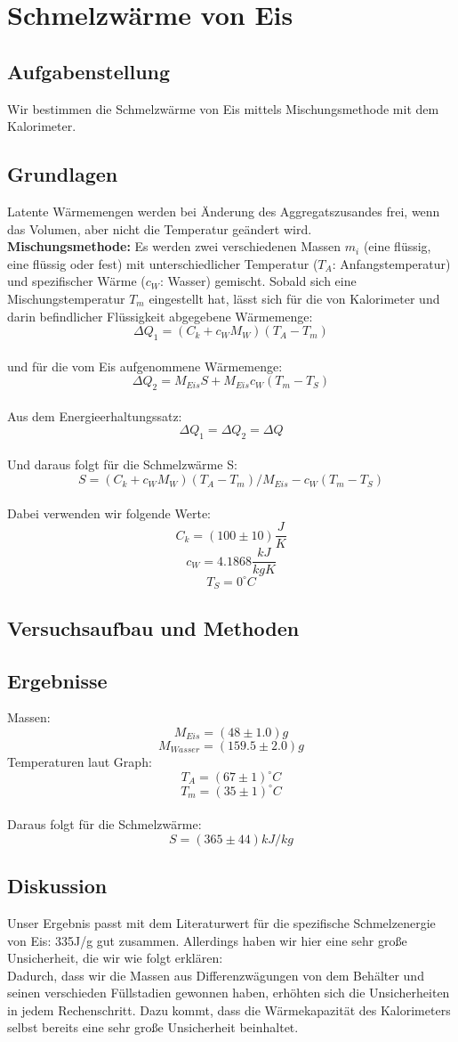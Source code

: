 \documentclass{article}
\begin{document}
\section{Schmelzwärme von Eis}
\subsection{Aufgabenstellung}
Wir bestimmen die Schmelzwärme von Eis mittels Mischungsmethode mit dem Kalorimeter.
\subsection{Grundlagen}
Latente Wärmemengen werden bei Änderung des Aggregatszusandes frei, wenn das Volumen, aber nicht die Temperatur geändert wird. \\
\textbf{Mischungsmethode:}
Es werden zwei verschiedenen Massen $m_i$ (eine flüssig, eine flüssig oder fest) mit unterschiedlicher Temperatur ($T_A$: Anfangstemperatur) und spezifischer Wärme ($c_W$: Wasser) gemischt. Sobald sich eine Mischungstemperatur $T_m$ eingestellt hat, lässt sich für die von Kalorimeter und darin befindlicher Flüssigkeit abgegebene Wärmemenge:
$$\Delta Q_1=(C_k + c_W M_W)(T_A - T_m)$$
\\
und für die vom Eis aufgenommene Wärmemenge:
$$\Delta Q_2=M_{Eis} S + M_{Eis} c_W (T_m - T_S)$$
\\
Aus dem Energieerhaltungssatz:
$$\Delta Q_1=\Delta Q_2=\Delta Q$$
\\
Und daraus folgt für die Schmelzwärme S:
$$S=(C_k+c_W M_W)(T_A-T_m) / M_{Eis} - c_W(T_m-T_S)$$
\\
Dabei verwenden wir folgende Werte: 
$$C_k=(100 \pm 10)\frac{J}{K}$$
$$c_W=4.1868 \frac{kJ}{kg K}$$
$$T_S=0 ^\circ C$$
\subsection{Versuchsaufbau und Methoden}

\subsection{Ergebnisse}
Massen:
$$M_{Eis}= (48 \pm 1.0)g$$
$$M_{Wasser} = (159.5 \pm 2.0)g$$
Temperaturen laut Graph:
$$T_A=(67 \pm 1) ^\circ C$$
$$T_m=(35 \pm 1) ^\circ C$$
\\
Daraus folgt für die Schmelzwärme:
$$\boxed{S=(365 \pm 44) kJ/kg}$$

\subsection{Diskussion}
Unser Ergebnis passt mit dem Literaturwert für die spezifische Schmelzenergie von Eis: 335J/g gut zusammen. Allerdings haben wir hier eine sehr große Unsicherheit, die wir wie folgt erklären:\\
Dadurch, dass wir die Massen aus Differenzwägungen von dem Behälter und seinen verschieden Füllstadien gewonnen haben, erhöhten sich die Unsicherheiten in jedem Rechenschritt. Dazu kommt, dass die Wärmekapazität des Kalorimeters selbst bereits eine sehr große Unsicherheit beinhaltet.
\end{document}
